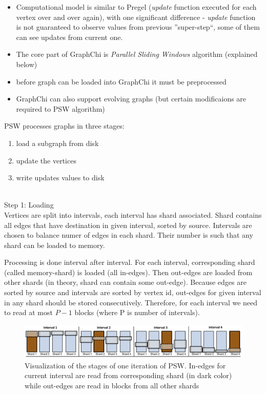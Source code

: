 \begin{itemize}
    \item Computational model is similar to Pregel (\textit{update} function executed for each vertex over and over again), with one significant difference - \textit{update} function is not guaranteed to observe values from previous ''super-step``, some of them can see updates from current one.
    \item The core part of GraphChi is \textit{Parallel Sliding Windows} algorithm (explained below)
\item before graph can be loaded into GraphChi it must be preprocessed
\item GraphChi can also support evolving graphs (but certain modificaions are required to PSW algorithm)
\end{itemize}


PSW processes graphs in three stages:
\begin{enumerate}
    \item load a subgraph from disk
    \item update the vertices
    \item write updates values to disk
\end{enumerate}

\\
Step 1: Loading
\\
Vertices are split into intervals, each interval has shard associated. Shard contains all edges that have destination in given interval, sorted by source. Intervals are chosen to balance numer of edges in each shard. Their number is such that any shard can be loaded to memory.

\noindent
Processing is done interval after interval. For each interval, corresponding shard (called memory-shard) is loaded (all in-edges). Then out-edges are loaded from other shards (in theory, shard can contain some out-edge). Because edges are sorted by source and intervals are sorted by vertex id, out-edges for given interval in any shard should be stored consecutively.
Therefore, for each interval we need to read at most $P-1$ blocks (where P is number of intervals).

\begin{figure}
    \centering
    \includegraphics[scale=0.2]{images/graphchi-sliding-window.jpg}
    \caption{Visualization of the stages of one iteration of PSW. In-edges for current interval are read from corresponding shard (in dark color) while out-edges are read in blocks from all other shards}
    \label{fig:graphchi-psw}
\end{figure}

